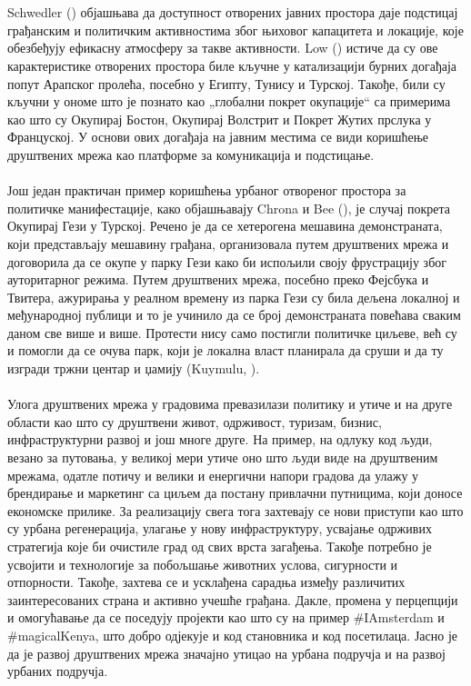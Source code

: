 \documentclass{article}
\begin{document}
\\\\
Schwedler (\cite{s_2013}) објашњава да доступност отворених јавних простора даје подстицај грађанским и политичким активностима због њиховог капацитета и локације, које обезбеђују ефикасну атмосферу за такве активности. Low (\cite{l_2017}) истиче да су ове карактеристике отворених простора биле кључне у катализацији бурних догађаја попут Арапског пролећа, посебно у Египту, Тунису и Турској. Такође, били су кључни у ономе што је познато као „глобални покрет окупације“ са примерима као што су Окупирај Бостон, Окупирај Волстрит и Покрет Жутих прслука у Француској. У основи ових догађаја на јавним местима се види коришћење друштвених мрежа као платформе за комуникација и подстицање. \\\\
Још један практичан пример коришћења урбаног отвореног простора за политичке манифестације, како објашњавају Chrona и Bee (\cite{cb_2017}), је случај покрета Окупирај Гези у Турској. Речено је да се хетерогена мешавина демонстраната, који представљају мешавину грађана, организовала путем друштвених мрежа и договорила да се окупе у парку Гези како би испољили своју фрустрацију због ауторитарног режима. Путем друштвених мрежа, посебно преко Фејсбука и Твитера, ажурирања у реалном времену из парка Гези су била дељена локалној и међународној публици и то је учинило да се број демонстраната повећава сваким даном све више и више. Протести нису само постигли политичке циљеве, већ су и помогли да се очува парк, који је локална власт планирала да сруши и да ту изгради тржни центар и џамију (Kuymulu, \cite{k_2013}).
\\\\
Улога друштвених мрежа у градовима превазилази политику и утиче и на друге области као што су друштвени живот, одрживост, туризам, бизнис, инфраструктурни развој и још многе друге. На пример, на одлуку код људи, везано за путовања, у великој мери утиче оно што људи виде на друштвеним мрежама, одатле потичу и велики и енергични напори градова да улажу у брендирање и маркетинг са циљем да постану привлачни путницима, који доносе економске прилике. За реализацију свега тога захтевају се нови приступи као што су урбана регенерација, улагање у нову инфраструктуру, усвајање одрживих стратегија које би очистиле град од свих врста загађења. Такође потребно је усвојити и технологије за побољшање животних услова, сигурности и отпорности. Такође, захтева се и усклађена сарадња између различитих заинтересованих страна и активно учешће грађана. Дакле, промена у перцепцији и омогућавање да се поседују пројекти као што су на пример #IAmsterdam и #magicalKenya, што добро одјекује и код становника и код посетилаца. Јасно је да је развој друштвених мрежа значајно утицао на урбана подручја и на развој урбаних подручја.
\\
\newpage
\end{document}
